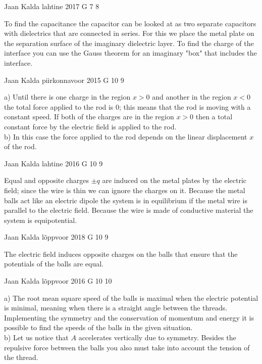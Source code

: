 \documentclass[11pt]{article}
\begin{document}
{Jaan Kalda} %
{lahtine} %
{2017} %
{G 7} %
{8} %
{

\ifEngHint
To find the capacitance the capacitor can be looked at as two separate capacitors with dielectrics that are connected in series. For this we place the metal plate on the separation surface of the imaginary dielectric layer. To find the charge of the interface you can use the Gauss theorem for an imaginary "box" that includes the interface.
\fi
}

{Jaan Kalda} %
{piirkonnavoor} %
{2015} %
{G 10} %
{9} %
{

\ifEngHint
a) Until there is one charge in the region $x>0$ and another in the region $x<0$ the total force applied to the rod is 0; this means that the rod is moving with a constant speed. If both of the charges are in the region $x>0$ then a total constant force by the electric field is applied to the rod.\\
b) In this case the force applied to the rod depends on the linear displacement $x$ of the rod.
\fi
}

{Jaan Kalda} %
{lahtine} %
{2016} %
{G 10} %
{9} %
{

\ifEngHint
Equal and opposite charges $\pm q$ are induced on the metal plates by the electric field; since the wire is thin we can ignore the charges on it. Because the metal balls act like an electric dipole the system is in equilibrium if the metal wire is parallel to the electric field. Because the wire is made of conductive material the system is equipotential.
\fi
}

{Jaan Kalda} %
{lõppvoor} %
{2018} %
{G 10} %
{9} %
{

\ifEngHint
The electric field induces opposite charges on the balls that ensure that the potentials of the balls are equal.
\fi
}

{Jaan Kalda} %
{lõppvoor} %
{2016} %
{G 10} %
{10} %
{

\ifEngHint
a) The root mean square speed of the balls is maximal when the electric potential is minimal, meaning when there is a straight angle between the threads. Implementing the symmetry and the conservation of momentum and energy it is possible to find the speeds of the balls in the given situation.\\
b) Let us notice that $A$ accelerates vertically due to symmetry. Besides the repulsive force between the balls you also must take into account the tension of the thread.
\fi
}
\end{document}
